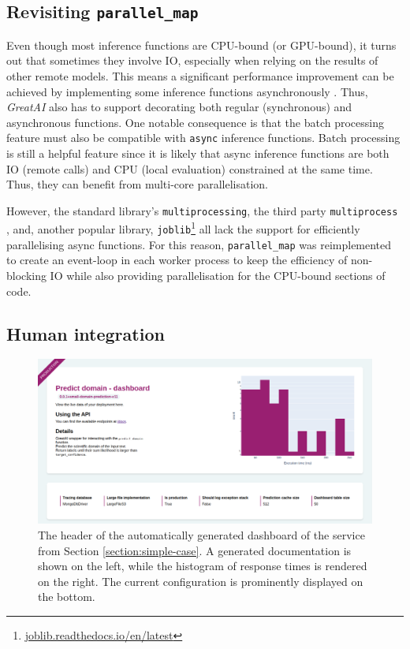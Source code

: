\subsection{Revisiting \texttt{parallel\_map}}

Even though most inference functions are CPU-bound (or GPU-bound), it turns out that sometimes they involve IO, especially when relying on the results of other remote models. This means a significant performance improvement can be achieved by implementing some inference functions asynchronously \cite{tilkov2010node}. Thus, \textit{GreatAI} also has to support decorating both regular (synchronous) and asynchronous functions. One notable consequence is that the batch processing feature must also be compatible with \texttt{async} inference functions. Batch processing is still a helpful feature since it is likely that async inference functions are both IO (remote calls) and CPU (local evaluation) constrained at the same time. Thus, they can benefit from multi-core parallelisation. 

However, the standard library's \texttt{multiprocessing}, the third party \texttt{multiprocess} \cite{mckerns2012building}, and, another popular library, \texttt{joblib}\footnote{\href{https://joblib.readthedocs.io/en/latest/}{joblib.readthedocs.io/en/latest}} all lack the support for efficiently parallelising async functions. For this reason, \texttt{parallel\_map} was reimplemented to create an event-loop in each worker process to keep the efficiency of non-blocking IO while also providing parallelisation for the CPU-bound sections of code.

\subsection{Human integration}

\begin{figure}
    \centering
    \includegraphics[width=\textwidth]{figures/greatai-header.png}
    \captionsetup{width=.9\linewidth}
    \caption{The header of the automatically generated dashboard of the service from Section \ref{section:simple-case}. A generated documentation is shown on the left, while the histogram of response times is rendered on the right. The current configuration is prominently displayed on the bottom.}
    \label{fig:greatai-header}
\end{figure}


